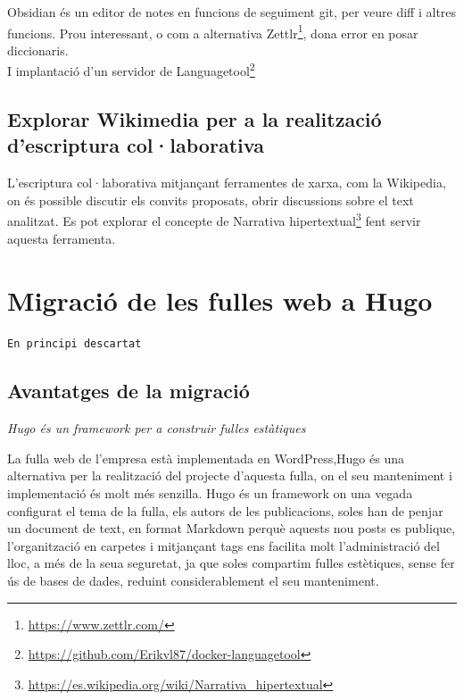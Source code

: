 \documentclass[
  10pt,
]{krantz}
\DeclareRobustCommand{\href}[2]{#2\footnote{\url{#1}}}
\begin{document}
Obsidian és un editor de notes en funcions de seguiment git, per veure diff i altres funcions. Prou interessant, o com a alternativa \href{https://www.zettlr.com/}{Zettlr}, dona error en posar diccionaris.\\
I implantació d'un servidor de \href{https://github.com/Erikvl87/docker-languagetool}{Languagetool}

\hypertarget{explorar-wikimedia-per-a-la-realitzaciuxf3-descriptura-collaborativa}{%
\section{Explorar Wikimedia per a la realització d'escriptura col·laborativa}\label{explorar-wikimedia-per-a-la-realitzaciuxf3-descriptura-collaborativa}}

L'escriptura col·laborativa mitjançant ferramentes de xarxa, com la Wikipedia, on és possible discutir els convits proposats, obrir discussions sobre el text analitzat. Es pot explorar el concepte de \href{https://es.wikipedia.org/wiki/Narrativa_hipertextual}{Narrativa hipertextual} fent servir aquesta ferramenta.

\hypertarget{migraciuxf3-de-les-fulles-web-a-hugo}{%
\chapter{Migració de les fulles web a Hugo}\label{migraciuxf3-de-les-fulles-web-a-hugo}}

\texttt{En\ principi\ descartat}

\hypertarget{avantatges-de-la-migraciuxf3}{%
\section{Avantatges de la migració}\label{avantatges-de-la-migraciuxf3}}

\emph{Hugo és un framework per a construir fulles estàtiques}

La fulla web de l'empresa està implementada en WordPress,Hugo és una alternativa per la realització del projecte d'aquesta fulla, on el seu manteniment i implementació és molt més senzilla. Hugo és un framework on una vegada configurat el tema de la fulla, els autors de les publicacions, soles han de penjar un document de text, en format Markdown perquè aquests nou posts es publique, l'organització en carpetes i mitjançant tags ens facilita molt l'administració del lloc, a més de la seua seguretat, ja que soles compartim fulles estètiques, sense fer ús de bases de dades, reduint considerablement el seu manteniment.
\end{document}
